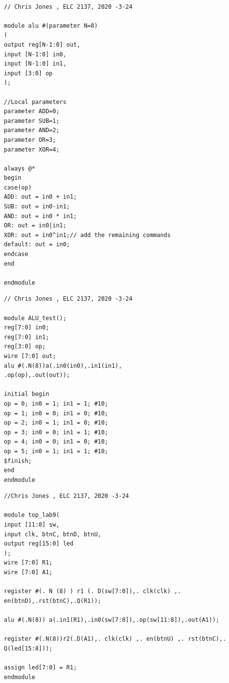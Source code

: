 \documentclass[11pt]{article}
\begin{document}
\begin{lstlisting}[style=Verilog,caption= Alu Source File,label=code:ex ]

// Chris Jones , ELC 2137, 2020 -3-24

module alu #(parameter N=8) 
(
output reg[N-1:0] out, 
input [N-1:0] in0, 
input [N-1:0] in1, 
input [3:0] op 
);

//Local parameters
parameter ADD=0; 
parameter SUB=1; 
parameter AND=2; 
parameter OR=3; 
parameter XOR=4;

always @* 
begin
case(op)
ADD: out = in0 + in1; 
SUB: out = in0-in1;
AND: out = in0 * in1;
OR: out = in0|in1;
XOR: out = in0^in1;// add the remaining commands 
default: out = in0;
endcase
end

endmodule

\end{lstlisting}


\begin{lstlisting}[style=Verilog,caption= Alu Test Bench ,label=code:ex ]
// Chris Jones , ELC 2137, 2020 -3-24

module ALU_test();
reg[7:0] in0;
reg[7:0] in1;
reg[3:0] op;
wire [7:0] out;
alu #(.N(8))a(.in0(in0),.in1(in1),
.op(op),.out(out));

initial begin
op = 0; in0 = 1; in1 = 1; #10;
op = 1; in0 = 0; in1 = 0; #10;
op = 2; in0 = 1; in1 = 0; #10;
op = 3; in0 = 0; in1 = 1; #10;
op = 4; in0 = 0; in1 = 0; #10;
op = 5; in0 = 1; in1 = 1; #10;
$finish;
end
endmodule

\end{lstlisting}



\begin{lstlisting}[style=Verilog,caption=Top Level Source File,label=code:ex ]
//Chris Jones , ELC 2137, 2020 -3-24

module top_lab9(
input [11:0] sw,
input clk, btnC, btnD, btnU,
output reg[15:0] led
);
wire [7:0] R1;
wire [7:0] A1;

register #(. N (8) ) r1 (. D(sw[7:0]),. clk(clk) ,. en(btnD),.rst(btnC),.Q(R1));

alu #(.N(8)) a(.in1(R1),.in0(sw[7:0]),.op(sw[11:8]),.out(A1));

register #(.N(8))r2(.D(A1),. clk(clk) ,. en(btnU) ,. rst(btnC),. Q(led[15:8]));

assign led[7:0] = R1;
endmodule

\end{lstlisting}
\end{document}
